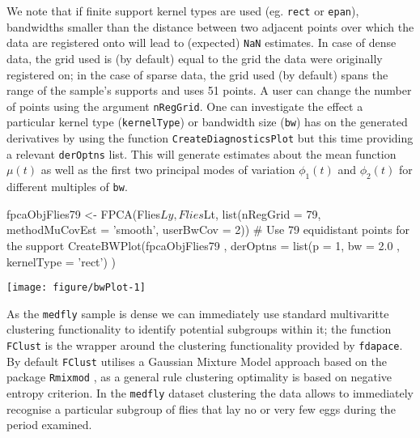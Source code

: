 \documentclass[11pt,english]{article}\usepackage[]{graphicx}\usepackage[]{color}
\makeatletter
\def\maxwidth{ %
  \ifdim\Gin@nat@width>\linewidth
    \linewidth
  \else
    \Gin@nat@width
  \fi
}
\makeatother
\begin{document}
We note that if finite support kernel types are used (eg. \texttt{rect} or \texttt{epan}), bandwidths smaller than the distance between two adjacent points over which the data are registered onto will lead to (expected) \texttt{NaN} estimates. In case of dense data, the grid used is (by default) equal to the grid the data were originally registered on; in the case of sparse data, the grid used (by default) spans the range of the sample's supports and uses 51 points. A user can change the number of points using the argument \texttt{nRegGrid}.  
One can investigate the effect a particular kernel type (\texttt{kernelType}) or bandwidth size (\texttt{bw}) has on the generated derivatives by using the function \texttt{CreateDiagnosticsPlot} but this time providing a relevant \texttt{derOptns} list. This will generate estimates about the mean function $\mu(t)$ as well as the first two principal modes of variation $\phi_1(t)$ and $\phi_2(t)$ for different multiples of \texttt{bw}. 

\begin{Schunk}
\begin{Sinput}
fpcaObjFlies79 <- FPCA(Flies$Ly, Flies$Lt, list(nRegGrid = 79, methodMuCovEst = 'smooth', userBwCov = 2)) # Use 79 equidistant points for the support
CreateBWPlot(fpcaObjFlies79 , derOptns = list(p = 1, bw = 2.0 , kernelType = 'rect') )
\end{Sinput}


{\centering \texttt{[image: figure/bwPlot-1]} 

}

\end{Schunk}




As the \texttt{medfly} sample is dense we can immediately use standard multivaritte clustering functionality to identify potential subgroups within it; the function  \texttt{FClust} is the wrapper around the clustering functionality provided by \texttt{fdapace}.  By default \texttt{FClust} utilises a Gaussian Mixture Model approach based on the package \texttt{Rmixmod} \cite{Biernacki2006}, as a general rule clustering optimality is based on negative entropy criterion. In the \texttt{medfly} dataset clustering the data allows to immediately recognise a particular subgroup of flies that lay no or very few eggs during the period examined.
 
\end{document}

